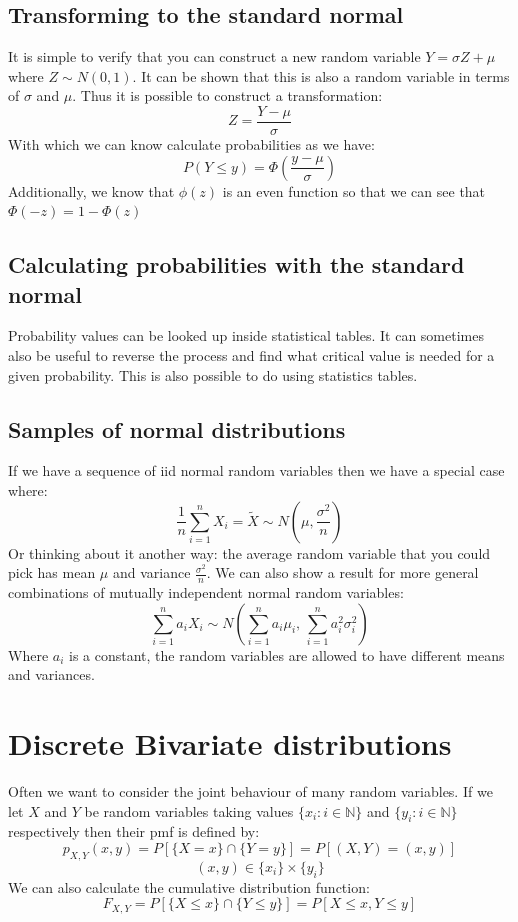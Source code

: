 \documentclass[12pt]{article}
\begin{document}
\subsection*{Transforming to the standard normal}
It is simple to verify that you can construct a new random variable \(Y=\sigma Z+\mu\) where \(Z\sim N(0,1)\). It can be shown that this is also a random variable in terms of \(\sigma\) and \(\mu\). Thus it is possible to construct a transformation:
\[Z=\frac{Y-\mu}{\sigma}\]
With which we can know calculate probabilities as we have:
\[P(Y\leq y)=\Phi\left(\frac{y-\mu}{\sigma}\right)\]
Additionally, we know that \(\phi(z)\) is an even function so that we can see that \(\Phi(-z)=1-\Phi(z)\)
\subsection*{Calculating probabilities with the standard normal}
Probability values can be looked up inside statistical tables. It can sometimes also be useful to reverse the process and find what critical value is needed for a given probability. This is also possible to do using statistics tables.
\subsection*{Samples of normal distributions}
If we have a sequence of iid normal random variables then we have a special case where:
\[\frac{1}{n}\sum_{i=1}^nX_i=\tilde{X}\sim N\left(\mu,\frac{\sigma^2}{n}\right)\]
Or thinking about it another way: the average random variable that you could pick has mean \(\mu\) and variance \(\frac{\sigma^2}{n}\). We can also show a result for more general combinations of mutually independent normal random variables:
\[\sum^n_{i=1}a_iX_i\sim N\left(\sum_{i=1}^na_i\mu_i,\,\sum^n_{i=1}a_i^2\sigma_i^2\right)\]
Where \(a_i\) is a constant, the random variables are allowed to have different means and variances.
\section{Discrete Bivariate distributions}
Often we want to consider the joint behaviour of many random variables. If we let \(X\) and \(Y\) be random variables taking values \(\{x_i:i\in\mathbb{N}\}\) and \(\{y_i:i\in\mathbb{N}\}\) respectively then their pmf is defined by:
\[p_{X,Y}(x,y)=P[\{X=x\}\cap\{Y=y\}]=P[(X,Y)=(x,y)]\]
\[(x,y)\in\{x_i\}\times\{y_i\}\]
We can also calculate the cumulative distribution function:
\[F_{X,Y}=P[\{X\leq x\}\cap\{Y\leq y\}]=P[X\leq x, Y\leq y]\]
\end{document}
